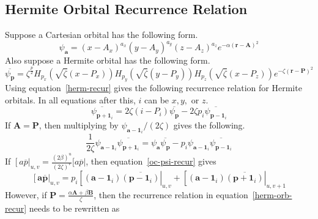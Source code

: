 \subsection{Hermite Orbital Recurrence Relation}

Suppose a Cartesian orbital has the following form.
\begin{equation}
  \psi_{\mathbf{a}} = \left(x - A_x\right)^{a_x}\left(y - A_y\right)^{a_y}\left(z - A_z\right)^{a_z}e^{-\alpha\left(\mathbf{r} - \mathbf{A}\right)^2}
\end{equation}
Also suppose a Hermite orbital has the following form.
\begin{equation}
  \overline{\psi_{\mathbf{p}}} = \zeta^{\frac{p}{2}} H_{p_x}\left(\sqrt{\zeta} \left(x - P_x\right)\right) H_{p_y}\left(\sqrt{\zeta} \left(y - P_y\right)\right)H_{p_z}\left(\sqrt{\zeta} \left(x - P_z\right)\right) e^{-\zeta\left(\mathbf{r} - \mathbf{P}\right)^2}
\end{equation}
Using equation~\ref{herm-recur} gives the following recurrence relation for Hermite orbitals. In all equations after this, $i$ can be $x, y,$ or $z$.
\begin{equation}
  \overline{\psi_{\mathbf{p} + \mathbf{1}_i}} = 2\zeta\left(i - P_i\right)\overline{\psi_{\mathbf{p}}} - 2\zeta p_i\overline{\psi_{\mathbf{p} - \mathbf{1}_i}}
  \label{herm-orb-recur}
\end{equation}
If $\mathbf{A} = \mathbf{P}$, then multiplying by $\psi_{\mathbf{a} - \mathbf{1}_i} / (2\zeta)$ gives the following.
\begin{equation}
  \frac{1}{2\zeta} \psi_{\mathbf{a} - \mathbf{1}_i} \overline{\psi_{\mathbf{p} + \mathbf{1}_i}} = \psi_{\mathbf{a}}\overline{\psi_{\mathbf{p}}} - p_i \psi_{\mathbf{a} - \mathbf{1}_i}\overline{\psi_{\mathbf{p} - \mathbf{1}_i}}
  \label{oc-psi-recur}
\end{equation}
If $\left[a\overline{p}\right|_{u,v} = \frac{(2\beta)^u}{(2\zeta)^v}[a\overline{p}|$, then equation~\ref{oc-psi-recur} gives
\begin{equation}
  \left[\mathbf{a}\overline{\mathbf{p}}\right|_{u,v} = p_i\left[\left(\mathbf{a} - \mathbf{1}_i\right)\overline{\left(\mathbf{p} - \mathbf{1}_i\right)}\right|_{u,v} + \left[\left(\mathbf{a} - \mathbf{1}_i\right)\overline{\left(\mathbf{p} + \mathbf{1}_i\right)}\right|_{u,v + 1}
  \label{oc-recur}
\end{equation}
However, if $\mathbf{P} = \frac{\alpha \mathbf{A} + \beta\mathbf{B}}{\zeta}$, then the recurrence relation in equation~\ref{herm-orb-recur} needs to be rewritten as

